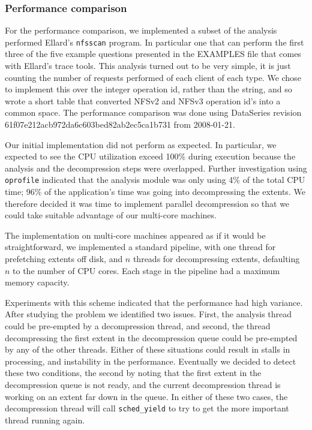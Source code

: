 \documentclass[twocolumn, 11pt]{article}
\begin{document}
\subsubsection{Performance comparison}

For the performance comparison, we implemented a subset of the
analysis performed Ellard's \texttt{nfsscan} program. In particular one
that can perform the first three of the five example questions
presented in the EXAMPLES file that comes with Ellard's trace tools.
This analysis turned out to be very simple, it is just counting the
number of requests performed of each client of each type.  We chose to
implement this over the integer operation id, rather than the string,
and so wrote a short table that converted NFSv2 and NFSv3 operation
id's into a common space. The performance comparison was done using
DataSeries revision 61f07e212acb972da6c603bed82ab2ec5ca1b731 from
2008-01-21.

Our initial implementation did not perform as expected.  In particular,
we expected to see
the CPU utilization exceed 100\% during execution because the
analysis and the decompression steps were overlapped.  Further
investigation using \texttt{oprofile} indicated that the analysis module was
only using 4\% of the total CPU time; 96\% of the application's time
was going into decompressing the extents.  We therefore decided it was
time to implement parallel decompression so that we could take
suitable advantage of our multi-core machines.

The implementation on multi-core machines appeared as if it would be
straightforward, we implemented a standard pipeline, with one thread for
prefetching extents off disk, and $n$ threads for decompressing
extents, defaulting $n$ to the number of CPU cores.  Each stage in the
pipeline had a maximum memory capacity.

Experiments with this scheme indicated that the performance had high
variance.  After studying the problem we identified two issues.
First, the analysis thread could be pre-empted by a decompression
thread, and second, the thread decompressing the first extent in the
decompression queue could be pre-empted by any of the other threads.
Either of these situations could result in stalls in processing, and
instability in the performance.  Eventually we decided to detect
these two conditions, the second by noting that the first extent in
the decompression queue is not ready, and the current decompression
thread is working on an extent far down in the queue.  In either of
these two cases, the decompression thread will call \texttt{sched\_yield} to
try to get the more important thread running again.
\end{document}
